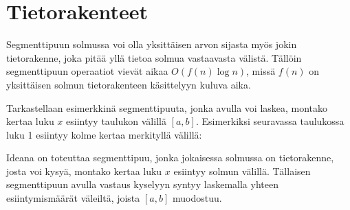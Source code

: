 \section{Tietorakenteet}

Segmenttipuun solmussa voi olla
yksittäisen arvon
sijasta myös jokin tietorakenne,
joka pitää yllä tietoa solmua vastaavasta välistä.
Tällöin segmenttipuun operaatiot vievät aikaa
$O(f(n) \log n)$, missä $f(n)$ on
yksittäisen solmun tietorakenteen
käsittelyyn kuluva aika.

Tarkastellaan esimerkkinä segmenttipuuta,
jonka avulla voi laskea, montako kertaa
luku $x$ esiintyy taulukon välillä $[a,b]$.
Esimerkiksi seuravassa taulukossa
luku 1 esiintyy kolme kertaa
merkityllä välillä:

\begin{center}
\end{center}

Ideana on toteuttaa segmenttipuu, jonka
jokaisessa solmussa on tietorakenne,
josta voi kysyä,
montako kertaa luku $x$ esiintyy solmun välillä.
Tällaisen segmenttipuun avulla
vastaus kyselyyn syntyy laskemalla yhteen
esiintymismäärät väleiltä, joista $[a,b]$ muodostuu.

